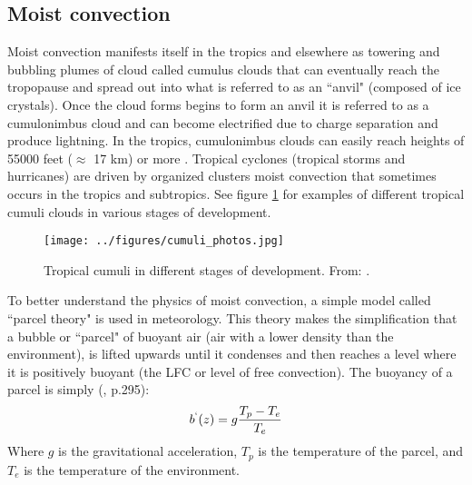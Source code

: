\documentclass[letterpaper,12pt,titlepage,oneside,final]{book}
\begin{document}
\subsection{Moist convection}\label{moist}

Moist convection manifests itself in the tropics and elsewhere as towering and bubbling plumes of cloud called cumulus clouds that can eventually reach the tropopause and spread out into what is referred to as an ``anvil" (composed of ice crystals). Once the cloud forms begins to form an anvil it is referred to as a cumulonimbus cloud and can become electrified due to charge separation and produce lightning. In the tropics, cumulonimbus clouds can easily reach heights of 55000 feet ($\approx$ 17 km) or more \citep{hollars_comparisons_2004}. Tropical cyclones (tropical storms and hurricanes) are driven by organized clusters moist convection that sometimes occurs in the tropics and subtropics. See figure \ref{fig:cumu} for examples of different tropical cumuli clouds in various stages of development.

\begin{figure}[H]
\centering
\noindent\texttt{[image: ../figures/cumuli\_photos.jpg]}\hfill
\caption{\footnotesize Tropical cumuli in different stages of development. From: \citep{evans_introduction_2011}.}
\label{fig:cumu}
\end{figure}

To better understand the physics of moist convection, a simple model called ``parcel theory" is used in meteorology. This theory makes the simplification that a bubble or ``parcel" of buoyant air (air with a lower density than the environment), is lifted upwards until it condenses and then reaches a level where it is positively buoyant (the LFC or level of free convection). The buoyancy of a parcel is simply (\citep{holton_introduction_2004}, p.295):
\begin{align}
b^{`}(z)=g\frac{T_{p}-T_{e}}{T_{e}}
\end{align}
Where $g$ is the gravitational acceleration, $T_{p}$ is the temperature of the parcel, and $T_{e}$ is the temperature of the environment.
\end{document}
